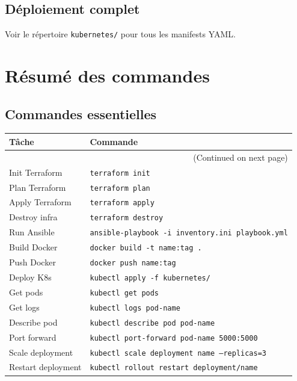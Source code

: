 \documentclass[12pt,a4paper,twoside]{report}
\begin{document}
\section{Déploiement complet}

Voir le répertoire \texttt{kubernetes/} pour tous les manifests YAML.

\chapter{Résumé des commandes}

\section{Commandes essentielles}

\begin{longtable}{|p{4cm}|p{5cm}|}
    \hline
    \textbf{Tâche} & \textbf{Commande} \\
    \hline
    \endhead
    \hline
    \multicolumn{2}{r}{(Continued on next page)} \\
    \endfoot
    \hline
    \endlastfoot
    Init Terraform & \texttt{terraform init} \\
    Plan Terraform & \texttt{terraform plan} \\
    Apply Terraform & \texttt{terraform apply} \\
    Destroy infra & \texttt{terraform destroy} \\
    Run Ansible & \texttt{ansible-playbook -i inventory.ini playbook.yml} \\
    Build Docker & \texttt{docker build -t name:tag .} \\
    Push Docker & \texttt{docker push name:tag} \\
    Deploy K8s & \texttt{kubectl apply -f kubernetes/} \\
    Get pods & \texttt{kubectl get pods} \\
    Get logs & \texttt{kubectl logs pod-name} \\
    Describe pod & \texttt{kubectl describe pod pod-name} \\
    Port forward & \texttt{kubectl port-forward pod-name 5000:5000} \\
    Scale deployment & \texttt{kubectl scale deployment name --replicas=3} \\
    Restart deployment & \texttt{kubectl rollout restart deployment/name} \\
\end{longtable}
\end{document}
